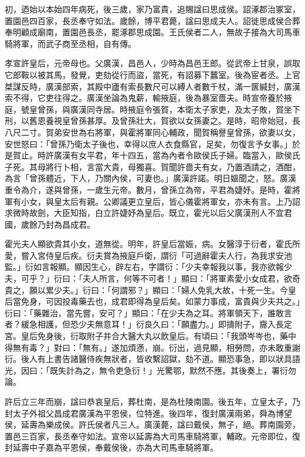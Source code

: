 \begin{pinyinscope}
初，迺始以本始四年病死，後三歲，家乃富貴，追賜諡曰思成侯。詔涿郡治冢室，置園邑四百家，長丞奉守如法。歲餘，博平君薨，諡曰思成夫人。詔徙思成侯合葬奉明顧成廟南，置園邑長丞，罷涿郡思成園。王氏侯者二人，無故子接為大司馬車騎將軍，而武子商至丞相，自有傳。

孝宣許皇后，元帝母也。父廣漢，昌邑人，少時為昌邑王郎。從武帝上甘泉，誤取它郎鞍以被其馬，發覺，吏劾從行而盜，當死，有詔募下蠶室。後為宦者丞。上官桀謀反時，廣漢部索，其殿中廬有索長數尺可以縛人者數千杖，滿一篋緘封，廣漢索不得，它吏往得之。廣漢坐論為鬼薪，輸掖庭，後為暴室嗇夫。時宣帝養於掖庭，號皇曾孫，與廣漢同寺居。時掖庭令張賀，本衛太子家吏，及太子敗，賀坐下刑，以舊恩養視皇曾孫甚厚。及曾孫壯大，賀欲以女孫妻之。是時，昭帝始冠，長八尺二寸。賀弟安世為右將軍，與霍將軍同心輔政，聞賀稱譽皇曾孫，欲妻以女，安世怒曰：「曾孫乃衛太子後也，幸得以庶人衣食縣官，足矣，勿復言予女事。」於是賀止。時許廣漢有女平君，年十四五，當為內者令歐侯氏子婦。臨當入，歐侯氏子死。其母將行卜相，言當大貴，母獨喜。賀聞許嗇夫有女，乃置酒請之，酒酣，為言「曾孫體近，下人，乃關內侯，可妻也。」廣漢許諾。明日嫗聞之，怒。廣漢重令為介，遂與曾孫，一歲生元帝。數月，曾孫立為帝，平君為婕妤。是時，霍將軍有小女，與皇太后有親。公卿議更立皇后，皆心儀霍將軍女，亦未有言。上乃詔求微時故劍，大臣知指，白立許婕妤為皇后。既立，霍光以后父廣漢刑人不宜君國，歲餘乃封為昌成君。

霍光夫人顯欲貴其小女，道無從。明年，許皇后當娠，病。女醫淳于衍者，霍氏所愛，嘗入宮侍皇后疾。衍夫賞為掖庭戶衛，謂衍「可過辭霍夫人行，為我求安池監。」衍如言報顯。顯因生心，辟左右，字謂衍：「少夫幸報我以事，我亦欲報少夫，可乎？」衍曰：「夫人所言，何等不可者！」顯曰：「將軍素愛小女成君，欲奇貴之，願以累少夫。」衍曰：「何謂邪？」顯曰：「婦人免乳大故，十死一生。今皇后當免身，可因投毒藥去也，成君即得為皇后矣。如蒙力事成，富貴與少夫共之。」衍曰：「藥雜治，當先嘗，安可？」顯曰：「在少夫為之耳。將軍領天下，誰敢言者？緩急相護，但恐少夫無意耳！」衍良久曰：「願盡力。」即擣附子，齎入長定宮。皇后免身後，衍取附子并合大醫大丸以飲皇后。有頃曰：「我頭岑岑也，藥中得無有毒？」對曰：「無有。」遂加煩懣，崩。衍出，過見顯，相勞問，亦未敢重謝衍。後人有上書告諸醫侍疾無狀者，皆收繫詔獄，劾不道。顯恐事急，即以狀具語光，因曰：「既失計為之，無令吏急衍！」光驚鄂，默然不應。其後奏上，署衍勿論。

許后立三年而崩，諡曰恭哀皇后，葬杜南，是為杜陵南園。後五年，立皇太子，乃封太子外祖父昌成君廣漢為平恩侯，位特進。後四年，復封廣漢兩弟，舜為博望侯，延壽為樂成侯。許氏侯者凡三人。廣漢薨，諡曰戴侯，無子，絕。葬南園旁，置邑三百家，長丞奉守如法。宣帝以延壽為大司馬車騎將軍，輔政。元帝即位，復封延壽中子嘉為平恩侯，奉戴侯後，亦為大司馬車騎將軍。


\end{pinyinscope}
